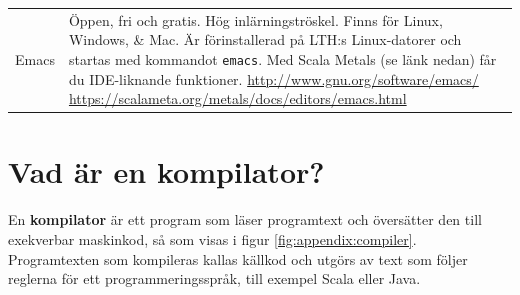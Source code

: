 \begin{table}
\begin{longtable}{@{}r | p{}}
Emacs & Öppen, fri och gratis. Hög inlärningströskel. Finns för Linux, Windows, \& Mac. Är förinstallerad på LTH:s Linux-datorer och startas med kommandot \verb+emacs+. Med Scala Metals (se länk nedan) får du IDE-liknande funktioner. \newline \url{http://www.gnu.org/software/emacs/} \newline \url{https://scalameta.org/metals/docs/editors/emacs.html}\\





\end{longtable}

\end{table}

\section{Vad är en kompilator?}

En \textbf{kompilator}  är ett program som läser programtext och översätter den till exekverbar maskinkod, så som visas i figur \ref{fig:appendix:compiler}. Programtexten som kompileras kallas källkod och utgörs av text som följer reglerna för ett programmeringsspråk, till exempel Scala eller Java.

